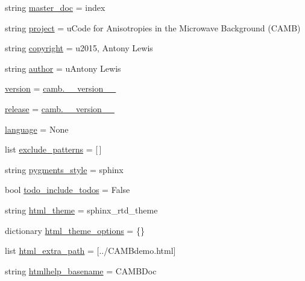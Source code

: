 \begin{DoxyCompactItemize}
\item 
string \mbox{\hyperlink{namespaceconf_ae22a29d94a222730836db739d6dbd71e}{master\+\_\+doc}} = \textquotesingle{}index\textquotesingle{}
\item 
string \mbox{\hyperlink{namespaceconf_aa2c6aefbed1597a70cfb45a760e5977c}{project}} = u\textquotesingle{}Code for Anisotropies in the Microwave Background (C\+A\+MB)\textquotesingle{}
\item 
string \mbox{\hyperlink{namespaceconf_ac8ccf456b321bc9052c0691a173b6925}{copyright}} = u\textquotesingle{}2015, Antony Lewis\textquotesingle{}
\item 
string \mbox{\hyperlink{namespaceconf_a6d7145a280c30059b454017b266c11c0}{author}} = u\textquotesingle{}Antony Lewis\textquotesingle{}
\item 
\mbox{\hyperlink{namespaceconf_af51f21968ea73bb4391b0d4aed1f7ad2}{version}} = \mbox{\hyperlink{namespacecamb_a68e3f34837e39bb6f7e725612e4627fa}{camb.\+\_\+\+\_\+version\+\_\+\+\_\+}}
\item 
\mbox{\hyperlink{namespaceconf_aee93453546a31f4e76999ebaadf6e356}{release}} = \mbox{\hyperlink{namespacecamb_a68e3f34837e39bb6f7e725612e4627fa}{camb.\+\_\+\+\_\+version\+\_\+\+\_\+}}
\item 
\mbox{\hyperlink{namespaceconf_ad76a2e6d7bfa880ebb4042c08e8b4e12}{language}} = None
\item 
list \mbox{\hyperlink{namespaceconf_aa01918cfe75aed3ae059dd96c71c8f08}{exclude\+\_\+patterns}} = \mbox{[}$\,$\mbox{]}
\item 
string \mbox{\hyperlink{namespaceconf_afa4e4ed164119ef5f4656e9554ed1f1b}{pygments\+\_\+style}} = \textquotesingle{}sphinx\textquotesingle{}
\item 
bool \mbox{\hyperlink{namespaceconf_a9c4d0250afe7e547830927b55eadeec5}{todo\+\_\+include\+\_\+todos}} = False
\item 
string \mbox{\hyperlink{namespaceconf_a7f1b143ff25817758abd21a7db110510}{html\+\_\+theme}} = \textquotesingle{}sphinx\+\_\+rtd\+\_\+theme\textquotesingle{}
\item 
dictionary \mbox{\hyperlink{namespaceconf_a59fb37ca5915e18823f5f433129b35ec}{html\+\_\+theme\+\_\+options}} = \{\}
\item 
list \mbox{\hyperlink{namespaceconf_a4a6eed5b599783e721f1407368c0c422}{html\+\_\+extra\+\_\+path}} = \mbox{[}\textquotesingle{}../C\+A\+M\+Bdemo.\+html\textquotesingle{}\mbox{]}
\item 
string \mbox{\hyperlink{namespaceconf_a74d707b34bba474e9057f383ad01de83}{htmlhelp\+\_\+basename}} = \textquotesingle{}C\+A\+M\+B\+Doc\textquotesingle{}

\end{DoxyCompactItemize}
